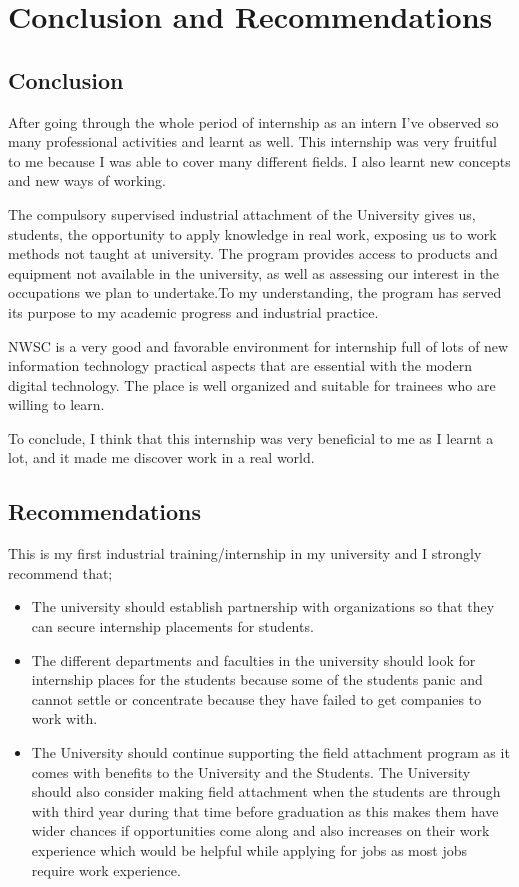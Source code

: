 \documentclass{article}
\begin{document}
\section{Conclusion and Recommendations}
\subsection{Conclusion}
After going through the whole period of internship as an intern I’ve observed so many professional activities and learnt as well. This internship was very fruitful to me because I was able  to cover many different fields. I also learnt new concepts and new ways of working.
\par The compulsory supervised industrial attachment of the University gives us, students, the opportunity to apply knowledge in real work, exposing us to work methods not taught at university. The program provides access to products and equipment not available in the university, as well as assessing our interest in the occupations we plan to undertake.To my understanding, the program has served its purpose to my academic progress and industrial practice.
\par NWSC  is a very good and favorable environment for internship full of lots of new information technology practical aspects that are essential with the modern digital technology. The place is well organized and suitable for trainees who are willing to learn.
\par To conclude, I think that this internship was very beneficial to me as I learnt a lot, and it made me discover work in a real world.
\subsection{Recommendations}
This is my first industrial training/internship in my university and I strongly recommend that;
\begin{itemize}
\item The university should establish partnership with organizations so that they can secure internship placements for students.
\item The different departments and faculties in the university should look for internship places for the students because some of the students panic and cannot settle or concentrate because they have failed to get companies to work with.
\item The University should continue supporting the field attachment program as it comes with benefits to the University and the Students. The University should also consider making field attachment when the students are through with third year during that time before graduation  as this makes them have wider chances if opportunities come along and also increases on their work experience which would be helpful while applying for jobs as most jobs require work experience.
\end{itemize}
\newpage
\end{document}

